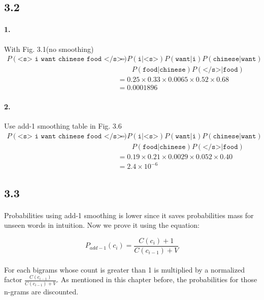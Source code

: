 \documentclass{article}
\begin{document}
\subsection*{3.2}
\paragraph{1.}
With Fig. 3.1(no smoothing)
\begin{align*}
    P(\texttt{<s> i want chinese food </s>})
     & = P(\texttt{i|<s>}) P(\texttt{want|i}) P(\texttt{chinese|want}) \\
     & \qquad P(\texttt{food|chinese}) P(\texttt{</s>|food})           \\
     & = 0.25 \times 0.33 \times 0.0065 \times 0.52 \times 0.68        \\
     & = 0.0001896
\end{align*}

\paragraph{2.}
Use add-1 smoothing table in Fig. 3.6
\begin{align*}
    P(\texttt{<s> i want chinese food </s>})
     & = P(\texttt{i|<s>}) P(\texttt{want|i})P(\texttt{chinese|want}) \\
     & \qquad P(\texttt{food|chinese}) P(\texttt{</s>|food})          \\
     & = 0.19 \times 0.21 \times 0.0029 \times 0.052 \times 0.40      \\
     & = 2.4 \times 10^{-6}
\end{align*}

\subsection*{3.3}
\paragraph{}
Probabilities using add-1 smoothing is lower since it saves probabilities
mass for unseen words in intuition. Now we prove it using the equation:

$$P_{add-1}(c_i) = \displaystyle\frac{C(c_i) + 1}{C(c_{i-1}) + V}$$

\paragraph{}
For each bigrams whose count is greater than 1
is multiplied by a normalized factor $\displaystyle\frac{C(c_{i-1})}{C(c_{i-1}) + V}$.
As mentioned in this chapter before, the probabilities for those n-grams are discounted.
\end{document}
